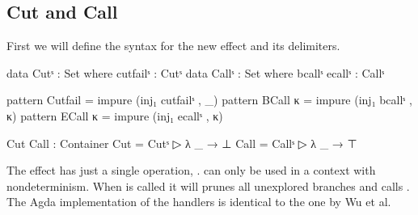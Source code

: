 \subsection{Cut and Call}

First we will define the syntax for the new effect and its delimiters.

\begin{code}
data Cutˢ : Set where cutfailˢ : Cutˢ
data Callˢ : Set where bcallˢ ecallˢ : Callˢ

pattern Cutfail = impure (inj₁ cutfailˢ , _)
pattern BCall κ = impure (inj₁ bcallˢ , κ)
pattern ECall κ = impure (inj₁ ecallˢ , κ)

Cut Call : Container
Cut   = Cutˢ    ▷ λ _ → ⊥
Call  = Callˢ   ▷ λ _ → ⊤
\end{code}
The  effect has just a single operation, .
 can only be used in a context with nondeterminism.
When  is called it will prunes all unexplored branches and
calls .
The Agda implementation of the handlers is identical to the one by Wu et al.

